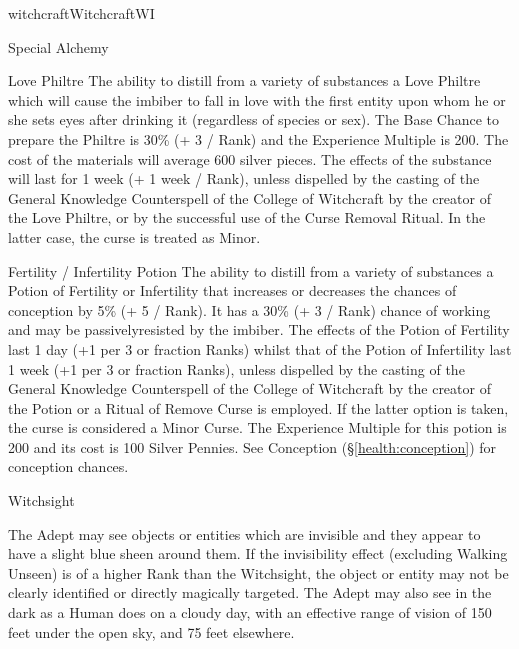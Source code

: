 \begin{College}[1.1]{witchcraft}{Witchcraft}{WI}
\begin{talent}[T-2]{Special Alchemy}
\begin{effects}
\begin{Description}
\item[Love Philtre] The ability to distill from a variety of
  substances a Love Philtre which will cause the imbiber to fall in
  love with the first entity upon whom he or she sets eyes after
  drinking it (regardless of species or sex). The Base Chance to
  prepare the Philtre is 30\% (+ 3 / Rank) and the Experience Multiple
  is 200.  The cost of the materials will average 600 silver pieces.
  The effects of the substance will last for 1 week (+ 1 week /
  Rank), unless dispelled by the casting of the General Knowledge
  Counterspell of the College of Witchcraft by the creator of the Love
  Philtre, or by the successful use of the Curse Removal Ritual. In
  the latter case, the curse is treated as Minor.

\item[Fertility / Infertility] Potion The ability to distill from a
  variety of substances a Potion of Fertility or Infertility that
  increases or decreases the chances of conception by 5\% (+ 5 /
  Rank). It has a 30\% (+ 3 / Rank) chance of working and may be
  passivelyresisted by the imbiber. The effects of the Potion of
  Fertility last 1 day (+1 per 3 or fraction Ranks) whilst that of the
  Potion of Infertility last 1 week (+1 per 3 or fraction Ranks),
  unless dispelled by the casting of the General Knowledge
  Counterspell of the College of Witchcraft by the creator of the
  Potion or a Ritual of Remove Curse is employed. If the latter option
  is taken, the curse is considered a Minor Curse.  The Experience
  Multiple for this potion is 200 and its cost is 100 Silver
  Pennies. See Conception (\S\ref{health:conception}) for conception
  chances.
\end{Description}
\end{effects}
\end{talent}

\begin{talent}[T-3]{Witchsight}

\begin{effects}
The Adept may see objects or entities which are invisible and they
appear to have a slight blue sheen around them.  If the invisibility
effect (excluding Walking Unseen) is of a higher Rank than the
Witchsight, the object or entity may not be clearly identified or
directly magically targeted.  The Adept may also see in the dark as a
Human does on a cloudy day, with an effective range of vision of 150
feet under the open sky, and 75 feet elsewhere.
\end{effects}
\end{talent}


\end{College}
